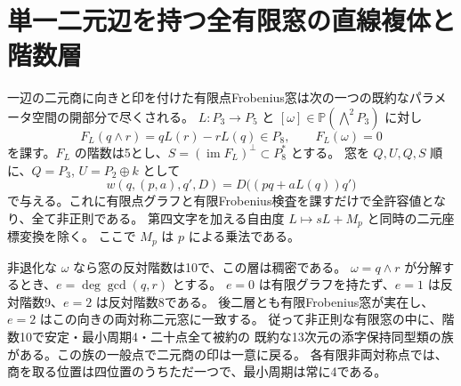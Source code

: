 \section{単一二元辺を持つ全有限窓の直線複体と階数層}
\label{sec:binary-linear-complex}
\begin{theorem}\label{thm:binary-linear-complex}
一辺の二元商に向きと印を付けた有限点Frobenius窓は次の一つの既約なパラメータ空間の開部分で尽くされる。
$L:P_3\to P_5$ と $[\omega]\in\mathbb P(\bigwedge^2 P_3)$ に対し
\[
 F_L(q\wedge r)=qL(r)-rL(q)\in P_8,\qquad F_L(\omega)=0
\]
を課す。$F_L$ の階数は5とし、$S=(\operatorname{im}F_L)^\perp\subset P_8^*$ とする。
窓を $Q,U,Q,S$ 順に、$Q=P_3$, $U=P_2\oplus k$ として
\[
  w(q,(p,a),q',D)=D\big((pq+aL(q))q'\big)
\]
で与える。これに有限点グラフと有限Frobenius検査を課すだけで全許容値となり、全て非正則である。
第四文字を加える自由度 $L\mapsto sL+M_p$ と同時の二元座標変換を除く。
ここで $M_p$ は $p$ による乗法である。

非退化な $\omega$ なら窓の反対階数は10で、この層は稠密である。
$\omega=q\wedge r$ が分解するとき、$e=\deg\gcd(q,r)$ とする。
$e=0$ は有限グラフを持たず、$e=1$ は反対階数9、$e=2$ は反対階数8である。
後二層とも有限Frobenius窓が実在し、$e=2$ はこの向きの両対称二元窓に一致する。
従って非正則な有限窓の中に、階数10で安定・最小周期4・二十点全て被約の
既約な13次元の添字保持同型類の族がある。この族の一般点で二元商の印は一意に戻る。
各有限非両対称点では、商を取る位置は四位置のうちただ一つで、最小周期は常に4である。
\end{theorem}

